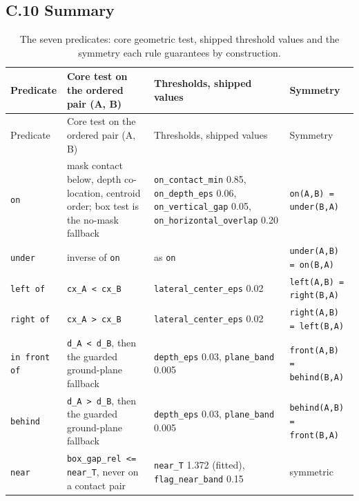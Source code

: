 \subsection{C.10 Summary}

\begin{center}
\setlength{\tabcolsep}{3pt}
\footnotesize
\begin{longtable}{>{\raggedright\arraybackslash}p{}>{\raggedright\arraybackslash}p{}>{\raggedright\arraybackslash}p{}>{\raggedright\arraybackslash}p{}}
\caption[The seven predicates]{The seven predicates: core geometric test, shipped threshold values and the symmetry each rule guarantees by construction.}\\
\hline
Predicate & Core test on the ordered pair (A, B) & Thresholds, shipped values & Symmetry \\
\hline
\endfirsthead
\hline
Predicate & Core test on the ordered pair (A, B) & Thresholds, shipped values & Symmetry \\
\hline
\endhead
\texttt{on} & mask contact below, depth co-location, centroid order; box test is the no-mask fallback & \texttt{on\_\allowbreak{}contact\_\allowbreak{}min} 0.85, \texttt{on\_\allowbreak{}depth\_\allowbreak{}eps} 0.06, \texttt{on\_\allowbreak{}vertical\_\allowbreak{}gap} 0.05, \texttt{on\_\allowbreak{}horizontal\_\allowbreak{}overlap} 0.20 & \texttt{on(A,B) = under(B,A)} \\
\texttt{under} & inverse of \texttt{on} & as \texttt{on} & \texttt{under(A,B) = on(B,A)} \\
\texttt{left of} & \texttt{cx\_\allowbreak{}A < cx\_\allowbreak{}B} & \texttt{lateral\_\allowbreak{}center\_\allowbreak{}eps} 0.02 & \texttt{left(A,B) = right(B,A)} \\
\texttt{right of} & \texttt{cx\_\allowbreak{}A > cx\_\allowbreak{}B} & \texttt{lateral\_\allowbreak{}center\_\allowbreak{}eps} 0.02 & \texttt{right(A,B) = left(B,A)} \\
\texttt{in front of} & \texttt{d\_\allowbreak{}A < d\_\allowbreak{}B}, then the guarded ground-plane fallback & \texttt{depth\_\allowbreak{}eps} 0.03, \texttt{plane\_\allowbreak{}band} 0.005 & \texttt{front(A,B) = behind(B,A)} \\
\texttt{behind} & \texttt{d\_\allowbreak{}A > d\_\allowbreak{}B}, then the guarded ground-plane fallback & \texttt{depth\_\allowbreak{}eps} 0.03, \texttt{plane\_\allowbreak{}band} 0.005 & \texttt{behind(A,B) = front(B,A)} \\
\texttt{near} & \texttt{box\_\allowbreak{}gap\_\allowbreak{}rel <= near\_\allowbreak{}T}, never on a contact pair & \texttt{near\_\allowbreak{}T} 1.372 (fitted), \texttt{flag\_\allowbreak{}near\_\allowbreak{}band} 0.15 & symmetric \\
\hline
\end{longtable}
\end{center}

